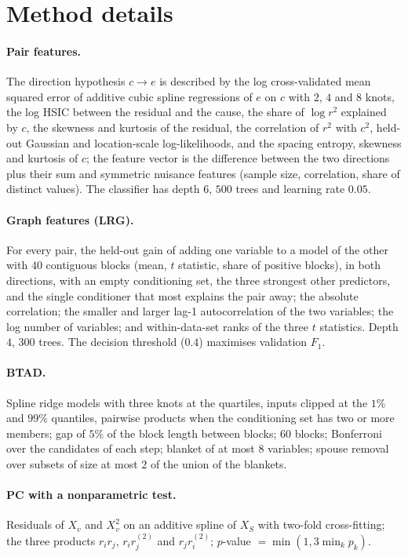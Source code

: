 
\section{Method details}\label{app:methods}

\paragraph{Pair features.} The direction hypothesis $c\to e$ is described by the log
cross-validated mean squared error of additive cubic spline regressions of $e$ on $c$ with
$2$, $4$ and $8$ knots, the log HSIC between the residual and the cause, the share of
$\log r^2$ explained by $c$, the skewness and kurtosis of the residual, the correlation of
$r^2$ with $c^2$, held-out Gaussian and location-scale log-likelihoods, and the spacing
entropy, skewness and kurtosis of $c$; the feature vector is the difference between the two
directions plus their sum and symmetric nuisance features (sample size, correlation, share of
distinct values). The classifier has depth $6$, $500$ trees and learning rate $0.05$.

\paragraph{Graph features (LRG).} For every pair, the held-out gain of adding one variable to
a model of the other with $40$ contiguous blocks (mean, $t$ statistic, share of positive
blocks), in both directions, with an empty conditioning set, the three strongest other
predictors, and the single conditioner that most explains the pair away; the absolute
correlation; the smaller and larger lag-1 autocorrelation of the two variables; the log
number of variables; and within-data-set ranks of the three $t$ statistics. Depth $4$, $300$
trees. The decision threshold ($0.4$) maximises validation $F_1$.

\paragraph{BTAD.} Spline ridge models with three knots at the quartiles, inputs clipped at
the $1\%$ and $99\%$ quantiles, pairwise products when the conditioning set has two or more
members; gap of $5\%$ of the block length between blocks; $60$ blocks; Bonferroni over the
candidates of each step; blanket of at most $8$ variables; spouse removal over subsets of
size at most $2$ of the union of the blankets.

\paragraph{PC with a nonparametric test.} Residuals of $X_v$ and $X_v^2$ on an additive spline
of $X_S$ with two-fold cross-fitting; the three products $r_ir_j$, $r_ir_j^{(2)}$ and
$r_jr_i^{(2)}$; $p$-value $=\min(1,3\min_k p_k)$.

